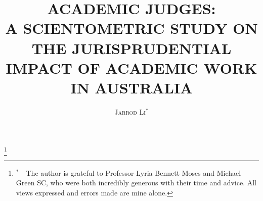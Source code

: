 \documentclass[12pt]{article}
\begin{document}

\thispagestyle{plain}
\renewcommand\footnotemark{}
\setlength\thanksmarkwidth{0.3em}
\setlength\thanksmargin{0.8em}

\title{\vspace{-25mm}\large{\textbf{\uppercase{Academic Judges:\\A Scientometric Study on the Jurisprudential Impact of Academic Work in Australia}}}}
\date{}
\author{\textsc{Jarrod Li}$^*$}
\thanks{$^*$\ \ The author is grateful to Professor Lyria Bennett Moses and Michael Green SC, who were both incredibly generous with their time and advice. All views expressed and errors made are mine alone.}
\maketitle


\newpage

\thispagestyle{plain}

\tableofcontents
\newpage

\pagestyle{fancy}











\end{document}
